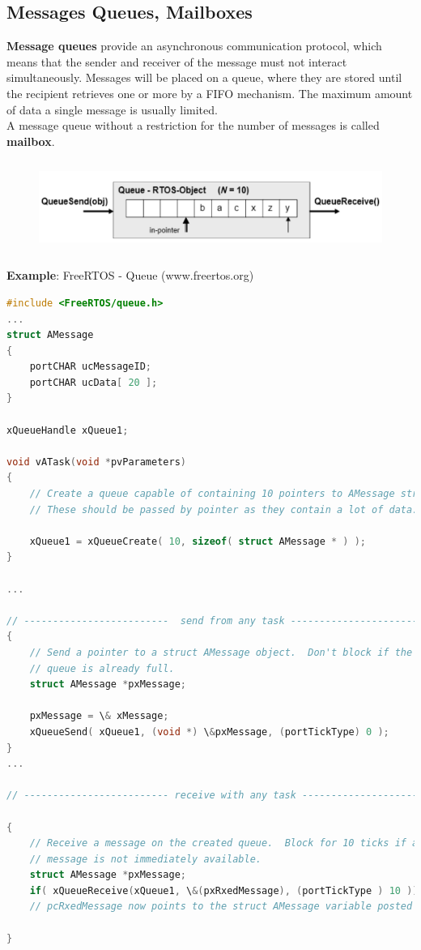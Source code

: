 \subsection{Messages Queues, Mailboxes}

\textbf{Message queues} provide an asynchronous communication protocol, which means that the sender and receiver of the message must not interact simultaneously. Messages will be placed on a queue, where they are stored until the recipient retrieves one or more by a FIFO mechanism. The maximum amount of data a single message is usually limited.\\

A message queue without a restriction for the number of messages is called \textbf{mailbox}.

 	\begin{figure}[h]
    \centering
    \includegraphics[width=14cm, height=3cm]{Images/image115.png}
    \label{fig:Fig }
    \end{figure}
\newpage    
\textbf{Example}: FreeRTOS - Queue (www.freertos.org)

\begin{lstlisting}[style=mystyle, language=c]
#include <FreeRTOS/queue.h>
...
struct AMessage
{
	portCHAR ucMessageID;
	portCHAR ucData[ 20 ];
}

xQueueHandle xQueue1;

void vATask(void *pvParameters)
{
	// Create a queue capable of containing 10 pointers to AMessage structures.
	// These should be passed by pointer as they contain a lot of data.

	xQueue1 = xQueueCreate( 10, sizeof( struct AMessage * ) );
}

...

// -------------------------  send from any task ----------------------------}
{
 	// Send a pointer to a struct AMessage object.  Don't block if the
  	// queue is already full.
 	struct AMessage *pxMessage;

 	pxMessage = \& xMessage;
	xQueueSend( xQueue1, (void *) \&pxMessage, (portTickType) 0 );
}
...

// ------------------------- receive with any task --------------------------}

{  
	// Receive a message on the created queue.  Block for 10 ticks if a
	// message is not immediately available.
	struct AMessage *pxMessage;
	if( xQueueReceive(xQueue1, \&(pxRxedMessage), (portTickType ) 10 ))
	// pcRxedMessage now points to the struct AMessage variable posted

}
\end{lstlisting}

